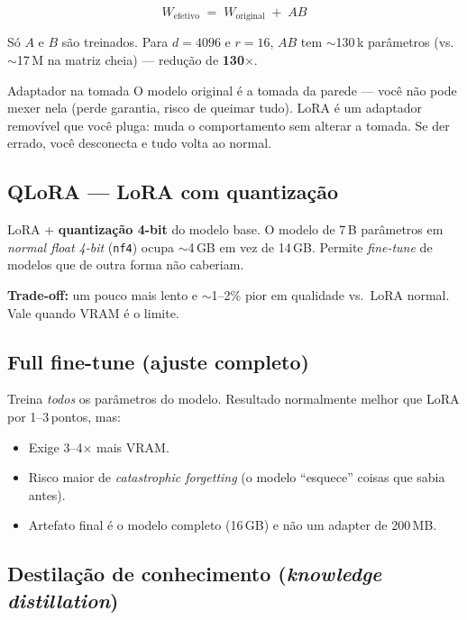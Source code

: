 \documentclass[11pt,a4paper]{article}
\newcommand{\code}[1]{\texttt{\small #1}}
\begin{document}
\begin{equation}
W_\text{efetivo} \;=\; W_\text{original} \;+\; AB
\end{equation}

Só $A$ e $B$ são treinados. Para $d=4096$ e $r=16$, $AB$ tem
$\sim$130\,k parâmetros (vs.\ $\sim$17\,M na matriz cheia)
--- redução de \textbf{130$\times$}.

\begin{analogia}{Adaptador na tomada}
O modelo original é a tomada da parede --- você não pode mexer nela
(perde garantia, risco de queimar tudo). LoRA é um adaptador
removível que você pluga: muda o comportamento sem alterar a tomada.
Se der errado, você desconecta e tudo volta ao normal.
\end{analogia}

\subsection{QLoRA --- LoRA com quantização}

LoRA + \textbf{quantização 4-bit} do modelo base. O modelo de 7\,B
parâmetros em \emph{normal float 4-bit} (\code{nf4}) ocupa $\sim$4\,GB
em vez de 14\,GB. Permite \emph{fine-tune} de modelos que de outra
forma não caberiam.

\textbf{Trade-off:} um pouco mais lento e $\sim$1--2\% pior em
qualidade vs.\ LoRA normal. Vale quando VRAM é o limite.

\subsection{Full fine-tune (ajuste completo)}

Treina \emph{todos} os parâmetros do modelo. Resultado normalmente
melhor que LoRA por \mbox{1--3\,pontos}, mas:

\begin{itemize}[leftmargin=*]
\item Exige 3--4$\times$ mais VRAM.
\item Risco maior de \emph{catastrophic forgetting} (o modelo
``esquece'' coisas que sabia antes).
\item Artefato final é o modelo completo (16\,GB) e não um adapter
de 200\,MB.
\end{itemize}

\subsection{Destilação de conhecimento (\emph{knowledge distillation})}
\end{document}
